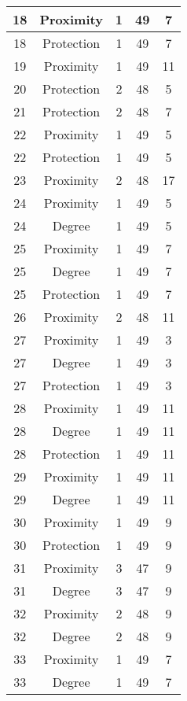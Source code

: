 \documentclass[results.tex]{subfiles}
\begin{document}
\begin{center}
\begin{tabular}{| c || c | c | c | c |}
    18 & Proximity & 1 & 49 & 7 \\ 
    \hline
    18 & Protection & 1 & 49 & 7 \\ 
    \hline
    19 & Proximity & 1 & 49 & 11 \\ 
    \hline
    20 & Protection & 2 & 48 & 5 \\ 
    \hline
    21 & Protection & 2 & 48 & 7 \\ 
    \hline
    22 & Proximity & 1 & 49 & 5 \\ 
    \hline
    22 & Protection & 1 & 49 & 5 \\ 
    \hline
    23 & Proximity & 2 & 48 & 17 \\ 
    \hline
    24 & Proximity & 1 & 49 & 5 \\ 
    \hline
    24 & Degree & 1 & 49 & 5 \\ 
    \hline
    25 & Proximity & 1 & 49 & 7 \\ 
    \hline
    25 & Degree & 1 & 49 & 7 \\ 
    \hline
    25 & Protection & 1 & 49 & 7 \\ 
    \hline
    26 & Proximity & 2 & 48 & 11 \\ 
    \hline
    27 & Proximity & 1 & 49 & 3 \\ 
    \hline
    27 & Degree & 1 & 49 & 3 \\ 
    \hline
    27 & Protection & 1 & 49 & 3 \\ 
    \hline
    28 & Proximity & 1 & 49 & 11 \\ 
    \hline
    28 & Degree & 1 & 49 & 11 \\ 
    \hline
    28 & Protection & 1 & 49 & 11 \\ 
    \hline
    29 & Proximity & 1 & 49 & 11 \\ 
    \hline
    29 & Degree & 1 & 49 & 11 \\ 
    \hline
    30 & Proximity & 1 & 49 & 9 \\ 
    \hline
    30 & Protection & 1 & 49 & 9 \\ 
    \hline
    31 & Proximity & 3 & 47 & 9 \\ 
    \hline
    31 & Degree & 3 & 47 & 9 \\ 
    \hline
    32 & Proximity & 2 & 48 & 9 \\ 
    \hline
    32 & Degree & 2 & 48 & 9 \\ 
    \hline
    33 & Proximity & 1 & 49 & 7 \\ 
    \hline
    33 & Degree & 1 & 49 & 7 \\ 
    \hline

\end{tabular}
\end{center}
\end{document}
